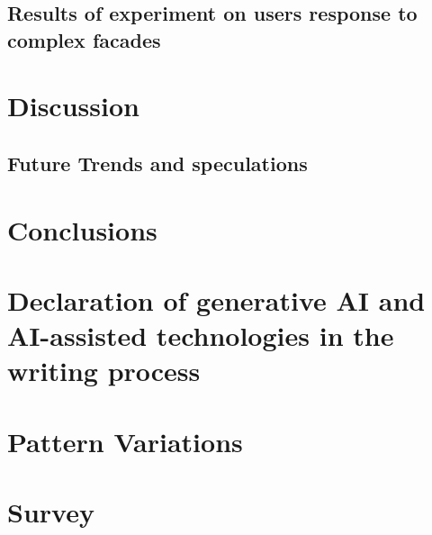 \documentclass[final,5p,times]{elsarticle}
\begin{document}
\begin{linenumbers}
    \subsection{Results of experiment on users response to complex facades}
    \label{subsec:ResultsExperiment}
    

\section{Discussion}
\label{sec:Discussion}


    \subsection{Future Trends and speculations}
    \label{subsec:Futuretrends}
    

\section{Conclusions}
\label{sec:Conclusion}
%

\section{Declaration of generative AI and AI-assisted technologies in the writing process}
\label{sec:Declaration AI}


\end{linenumbers}

\newpage
\appendix

\section{Pattern Variations}
\label{sec:Variations}


\section{Survey}
\label{sec:Annexsurvey}



\clearpage

    
    
\end{document}
